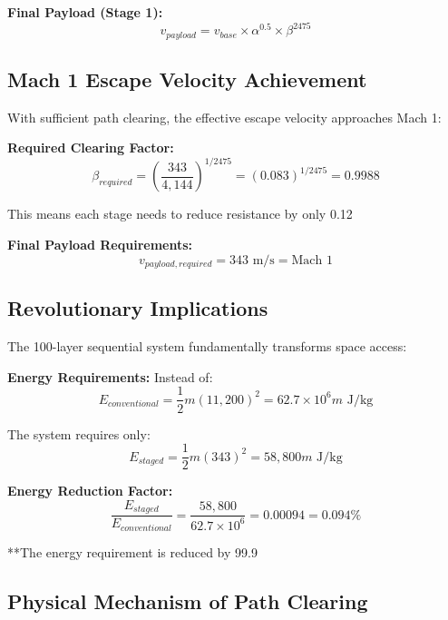\documentclass[12pt,a4paper]{article}
\begin{document}
\textbf{Final Payload (Stage 1):}
\begin{equation}
v_{payload} = v_{base} \times \alpha^{0.5} \times \beta^{2475}
\end{equation}

\subsection{Mach 1 Escape Velocity Achievement}

With sufficient path clearing, the effective escape velocity approaches Mach 1:

\textbf{Required Clearing Factor:}
\begin{equation}
\beta_{required} = \left(\frac{343}{4,144}\right)^{1/2475} = (0.083)^{1/2475} = 0.9988
\end{equation}

This means each stage needs to reduce resistance by only 0.12%

\textbf{Final Payload Requirements:}
\begin{equation}
v_{payload,required} = 343 \text{ m/s} = \text{Mach } 1
\end{equation}

\subsection{Revolutionary Implications}

The 100-layer sequential system fundamentally transforms space access:

\textbf{Energy Requirements:}
Instead of:
\begin{equation}
E_{conventional} = \frac{1}{2}m(11,200)^2 = 62.7 \times 10^6 m \text{ J/kg}
\end{equation}

The system requires only:
\begin{equation}
E_{staged} = \frac{1}{2}m(343)^2 = 58,800 m \text{ J/kg}
\end{equation}

\textbf{Energy Reduction Factor:}
\begin{equation}
\frac{E_{staged}}{E_{conventional}} = \frac{58,800}{62.7 \times 10^6} = 0.00094 = 0.094\%
\end{equation}

**The energy requirement is reduced by 99.9%

\subsection{Physical Mechanism of Path Clearing}
\end{document}
